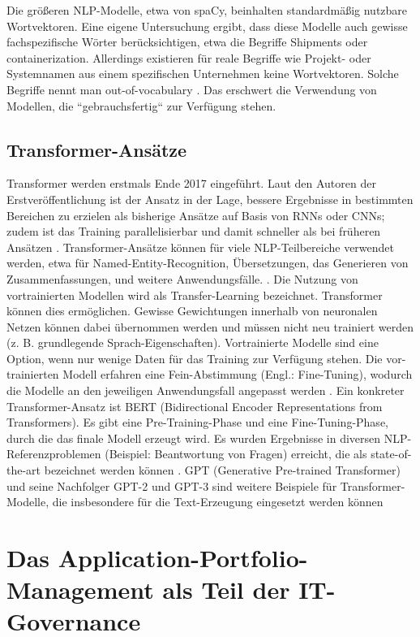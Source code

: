 Die größeren NLP-Modelle, etwa von spaCy, beinhalten standardmäßig nutzbare Wortvektoren. Eine eigene Untersuchung ergibt, dass diese Modelle auch gewisse fachspezifische Wörter berücksichtigen, etwa die Begriffe Shipments oder containerization. Allerdings existieren für reale Begriffe wie Projekt- oder Systemnamen aus einem spezifischen Unternehmen keine Wortvektoren. Solche Begriffe nennt man out-of-vocabulary \cite{spacy2}. Das erschwert die Verwendung von Modellen, die ``gebrauchsfertig`` zur Verfügung stehen. 

\subsection{Transformer-Ansätze}
Transformer werden erstmals Ende 2017 eingeführt. Laut den Autoren der Erstveröffentlichung ist der Ansatz in der Lage, bessere Ergebnisse in bestimmten Bereichen zu erzielen als bisherige Ansätze auf Basis von RNNs oder CNNs; zudem ist das Training parallelisierbar und damit schneller als bei früheren Ansätzen \cite{Vaswani}. Transformer-Ansätze können für viele NLP-Teilbereiche verwendet werden, etwa für Named-Entity-Recognition, Übersetzungen, das Generieren von Zusammenfassungen, und weitere Anwendungsfälle. \cite[S. 25-26]{Gupta}. Die Nutzung von vortrainierten Modellen wird als Transfer-Learning bezeichnet. Transformer können dies ermöglichen. Gewisse Gewichtungen innerhalb von neuronalen Netzen können dabei übernommen werden und müssen nicht neu trainiert werden (z. B. grundlegende Sprach-Eigenschaften). Vortrainierte Modelle sind eine Option, wenn nur wenige Daten für das Training zur Verfügung stehen. Die vor-trainierten Modell erfahren eine Fein-Abstimmung (Engl.: Fine-Tuning), wodurch die Modelle an den jeweiligen Anwendungsfall angepasst werden \cite[S. 45-56]{Alom}.
Ein konkreter Transformer-Ansatz ist BERT (Bidirectional Encoder Representations from Transformers). Es gibt eine Pre-Training-Phase und eine Fine-Tuning-Phase, durch die das finale Modell erzeugt wird. Es wurden Ergebnisse in diversen NLP-Referenzproblemen (Beispiel: Beantwortung von Fragen) erreicht, die als state-of-the-art bezeichnet werden können \cite{devlin}. 
GPT (Generative Pre-trained Transformer) und seine Nachfolger GPT-2 und GPT-3 sind weitere Beispiele für Transformer-Modelle, die insbesondere für die Text-Erzeugung eingesetzt werden können \cite{Brown}

\section{Das Application-Portfolio-Management als Teil der IT-Governance}


